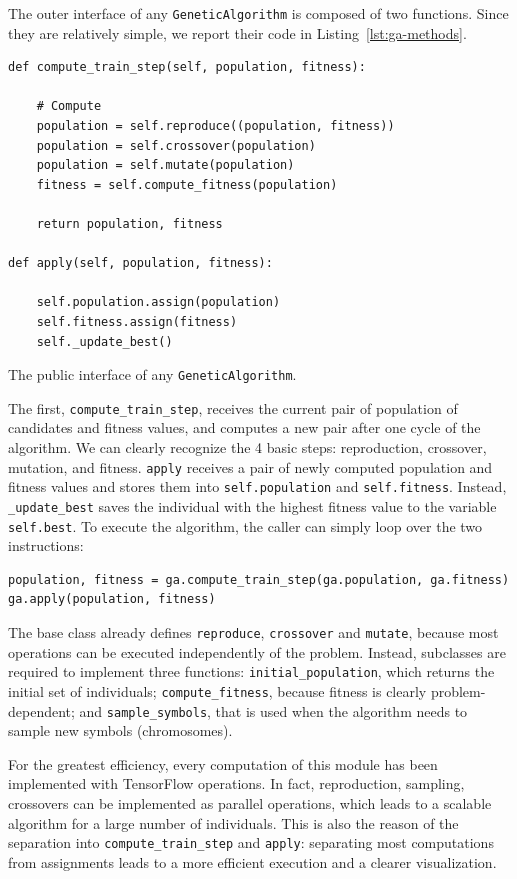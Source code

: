 The outer interface of any \texttt{GeneticAlgorithm} is composed of two
functions. Since they are relatively simple, we report their code in
Listing~\ref{lst:ga-methods}.
\begin{listing}
\begin{verbatim}
def compute_train_step(self, population, fitness):

	# Compute
	population = self.reproduce((population, fitness))
	population = self.crossover(population)
	population = self.mutate(population)
	fitness = self.compute_fitness(population)

	return population, fitness

def apply(self, population, fitness):

	self.population.assign(population)
	self.fitness.assign(fitness)
	self._update_best()
\end{verbatim}
\caption{The public interface of any \texttt{GeneticAlgorithm}.}
\label{lst:ga-methods}
\end{listing}
The first, \verb|compute_train_step|, receives the current pair of population
of candidates and fitness values, and computes a new pair after one cycle of
the algorithm. We can clearly recognize the 4 basic steps: reproduction,
crossover, mutation, and fitness. \verb|apply| receives a pair of newly
computed population and fitness values and stores them into
\verb|self.population| and \verb|self.fitness|. Instead, \verb|_update_best|
saves the individual with the highest fitness value to the variable
\verb|self.best|. To execute the algorithm, the caller can simply loop
over the two instructions:
\begin{verbatim}
population, fitness = ga.compute_train_step(ga.population, ga.fitness)
ga.apply(population, fitness)
\end{verbatim}

The base class already defines \texttt{reproduce}, \texttt{crossover} and
\texttt{mutate}, because most operations can be executed independently of the
problem. Instead, subclasses are required to implement three functions:
\verb|initial_population|, which returns the initial set of individuals;
\verb|compute_fitness|, because fitness is clearly problem-dependent; and
\verb|sample_symbols|, that is used when the algorithm needs to sample new
symbols (chromosomes).

For the greatest efficiency, every computation of this module has been
implemented with TensorFlow operations. In fact, reproduction, sampling,
crossovers can be implemented as parallel operations, which leads to a
scalable algorithm for a large number of individuals. This is also the reason
of the separation into \verb|compute_train_step| and \verb|apply|: separating
most computations from assignments leads to a more efficient execution and a
clearer visualization.

